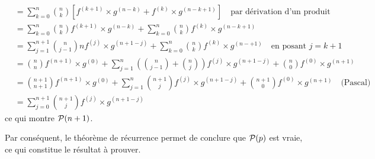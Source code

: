 \documentclass{article}
\begin{document}
\begin{question_kholle}
\begin{itemize}[label=$\vartriangleright$]
\begin{itemize}
\begin{align*}
				                                 & = \sum_{k=0}^{n}\binom{n}{k} \left[f^{(k+1)} \times g^{(n-k)} + f^{(k)} \times  g^{(n-k+1)}\right] \quad\text{par dérivation d’un produit}                        \\
				                                 & = \sum_{k=0}^{n}\binom{n}{k}f^{(k+1)} \times g^{(n-k)}+\sum_{k=0}^{n}\binom{n}{k}f^{(k)} \times g^{(n-k+1)}                                                       \\
				                                 & = \sum_{j=1}^{n+1}\binom{n}{j-1}nf^{(j)} \times g^{(n+1-j)} + \sum_{k=0}^{n}\binom{n}{k}f^{(k)} \times g^{(n-+1)} \quad\text{en posant } j=k+1                    \\
				                                 & = \binom{n}{n}f^{(n+1)} \times g^{(0)} + \sum_{j=1}^{n}\left(\binom{n}{j-1}+\binom{n}{j}\right)f^{(j)} \times g^{(n+1-j)} + \binom{n}{0}f^{(0)} \times g^{(n+1)}  \\
				                                 & = \binom{n+1}{n+1}f^{(n+1)} \times g^{(0)} + \sum_{j=1}^{n}\binom{n+1}{j}f^{(j)} \times g^{(n+1-j)} + \binom{n+1}{0}f^{(0)} \times g^{(n+1)} \quad\text{(Pascal)} \\
				                                 & = \sum_{j=0}^{n+1}\binom{n+1}{j}f^{(j)} \times g^{(n+1-j)}
			            \end{align*}
			            ce qui montre $\mathcal P(n+1)$.
		      \end{itemize}
		      Par conséquent, le théorème de récurrence permet de conclure que $\mathcal P(p)$ est vraie, ce qui constitue le résultat à prouver.
	\end{itemize}

\end{question_kholle}
\end{document}
